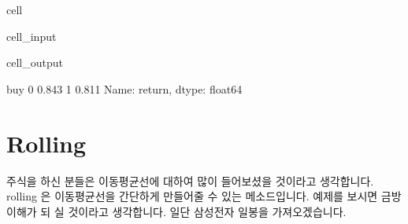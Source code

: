 \documentclass[letterpaper,10pt,english]{jupyterBook}
\begin{document}
\begin{sphinxuseclass}{cell}\begin{sphinxVerbatimInput}

\begin{sphinxuseclass}{cell_input}
\begin{sphinxVerbatim}[commandchars=\\\{\}]
\PYG{p}{[}\PYG{p}{]}
\end{sphinxVerbatim}

\end{sphinxuseclass}\end{sphinxVerbatimInput}
\begin{sphinxVerbatimOutput}

\begin{sphinxuseclass}{cell_output}
\begin{sphinxVerbatim}[commandchars=\\\{\}]
buy
0   0.843
1   0.811
Name: return, dtype: float64
\end{sphinxVerbatim}

\end{sphinxuseclass}\end{sphinxVerbatimOutput}

\end{sphinxuseclass}

\section{Rolling}
\label{\detokenize{chapter2/2.2.7_Useful_Techniques:rolling}}\label{\detokenize{chapter2/2.2.7_Useful_Techniques::doc}}
\sphinxAtStartPar
주식을 하신 분들은 이동평균선에 대하여 많이 들어보셨을 것이라고 생각합니다. rolling 은 이동평균선을 간단하게 만들어줄 수 있는 메소드입니다. 예제를 보시면 금방 이해가 되 실 것이라고 생각합니다. 일단 삼성전자 일봉을 가져오겠습니다.
\end{document}
